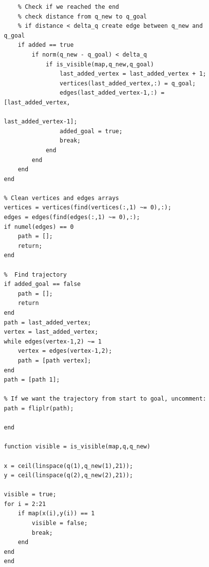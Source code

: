 \documentclass[journal]{IEEEtran}
\begin{document}
\begin{figure}
\begin{verbatim}
    % Check if we reached the end
    % check distance from q_new to q_goal
    % if distance < delta_q create edge between q_new and q_goal
    if added == true
        if norm(q_new - q_goal) < delta_q
            if is_visible(map,q_new,q_goal)
                last_added_vertex = last_added_vertex + 1;
                vertices(last_added_vertex,:) = q_goal;
                edges(last_added_vertex-1,:) = [last_added_vertex,
                                                last_added_vertex-1];
                added_goal = true;
                break;
            end
        end
    end
end

% Clean vertices and edges arrays
vertices = vertices(find(vertices(:,1) ~= 0),:);
edges = edges(find(edges(:,1) ~= 0),:);
if numel(edges) == 0
    path = [];
    return;
end

%  Find trajectory
if added_goal == false
    path = [];
    return
end
path = last_added_vertex;
vertex = last_added_vertex;
while edges(vertex-1,2) ~= 1
    vertex = edges(vertex-1,2);
    path = [path vertex];
end
path = [path 1];

% If we want the trajectory from start to goal, uncomment:
path = fliplr(path);

end

function visible = is_visible(map,q,q_new)

x = ceil(linspace(q(1),q_new(1),21));
y = ceil(linspace(q(2),q_new(2),21));

visible = true;
for i = 2:21
    if map(x(i),y(i)) == 1
        visible = false;
        break;
    end
end
end
\end{verbatim}
\end{figure}
\end{document}
